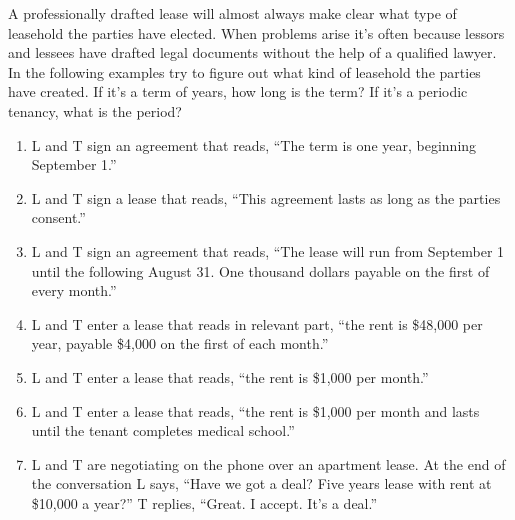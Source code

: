 
A professionally drafted lease will almost always make clear what type of
leasehold the parties have elected.  When problems arise it's often because
lessors and lessees have drafted legal documents without the help of a
qualified lawyer.  In the following examples try to figure out what kind of
leasehold the parties have created.  If it's a term of years, how long is the
term? If it's a periodic tenancy, what is the period?  
\begin{enumerate}
\item L and T sign an agreement that reads, ``The term is one year, beginning
September 1.''
\item L and T sign a lease that reads, ``This agreement lasts as long as the
parties consent.''
\item L and T sign an agreement that reads, ``The lease will run from September
1 until the following August 31.  One thousand dollars payable on the first of
every month.''
\item L and T enter a lease that reads in relevant part, ``the rent is \$48,000
per year, payable \$4,000 on the first of each month.''
\item L and T enter a lease that reads, ``the rent is \$1,000 per month.''  
\item L and T enter a lease that reads, ``the rent is \$1,000 per month and
lasts until the tenant completes medical school.'' 
\item L and T are negotiating on the phone over an apartment lease.  At the end
of the conversation L says, ``Have we got a deal?  Five years lease with rent
at \$10,000 a year?''  T replies, ``Great.  I accept. It's a deal.''
\end{enumerate}


